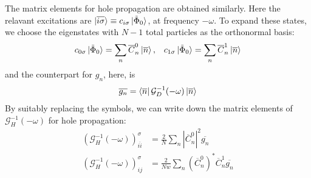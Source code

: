 \documentclass{report}
\numberwithin{equation}{section}
\begin{document}
\\\\
The matrix elements for hole propagation are obtained similarly. Here the relavant excitations are $\ket{\overline{i\sigma}} \equiv c_{i\sigma}\ket{\tilde \Phi_0}$, at frequency $-\omega$. To expand these states, we choose the eigenstates with $N-1$ total particles as the orthonormal basis:
\begin{equation}\begin{aligned}
	c_{0\sigma}\ket{\tilde \Phi_0} = \sum_n \overline C^0_n \ket{\overline{n}}, && c_{1\sigma}\ket{\tilde \Phi_0} = \sum_n \overline C^1_n \ket{\overline{n}}%
\end{aligned}\end{equation}
and the counterpart for $g_n$, here, is
\begin{equation}\begin{aligned}
	\overline {g_n} = \bra{\overline n}\mathcal{G}_{D}^{-1}(-\omega)\ket{\overline n}
\end{aligned}\end{equation}
By suitably replacing the symbols, we can write down the matrix elements of $\mathcal{G}_H^{-1}(-\omega)$ for hole propagation:
\begin{equation}\begin{aligned}
	\left(\mathcal{G}_{H}^{-1}(-\omega)\right)_{\overline{ii}}^\sigma &= \frac{2}{N}\sum_{n} |\overline C^0_{n}|^2 \overline{g_n}\\
	\left(\mathcal{G}_{H}^{-1}(-\omega)\right)_{ij}^\sigma &= \frac{2}{Nw}\sum_{n} \left(\overline C^0_{n}\right)^* \overline C^1_{n} \overline{g_n} 
\end{aligned}\end{equation}
\end{document}

